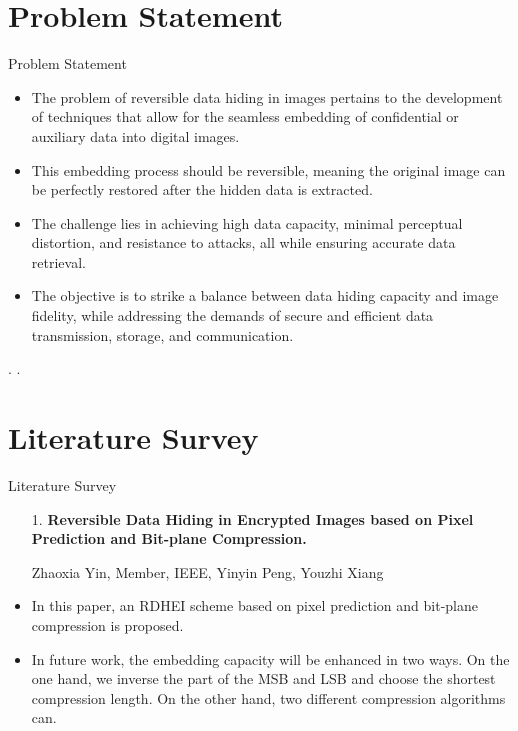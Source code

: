 \documentclass[10pt,xcolor=dvipsnames]{beamer}
\begin{document}
\section[Problem Statement]{Problem Statement}

\begin{frame}[fragile]{Problem Statement}
\begin{itemize}
    \item The problem of reversible data hiding in images pertains to the development of techniques that allow for the seamless embedding of confidential or auxiliary data into digital images.
    \item This embedding process should be reversible, meaning the original image can be perfectly restored after the hidden data is extracted.
    \item The challenge lies in achieving high data capacity, minimal perceptual distortion, and resistance to attacks, all while ensuring accurate data retrieval.
    \item The objective is to strike a balance between data hiding capacity and image fidelity, while addressing the demands of secure and efficient data transmission, storage, and communication.
\end{itemize}
  . .
  
\end{frame}

\section[Literature Survey]{Literature Survey}
\begin{frame}{Literature Survey}
\begin{itemize}
    \item[1.]\textbf{Reversible Data Hiding in Encrypted Images based
        on Pixel Prediction and Bit-plane Compression.}
        
        \small Zhaoxia Yin, Member, IEEE, Yinyin Peng, Youzhi Xiang
       \item In this paper, an RDHEI scheme based on pixel prediction
        and bit-plane compression is proposed.
        \item In future work, the embedding capacity will be enhanced
            in two ways. On the one hand, we inverse the part of the
MSB and LSB and choose the shortest compression length.
On the other hand, two different compression algorithms can.
\end{itemize}
\end{frame}
\end{document}
